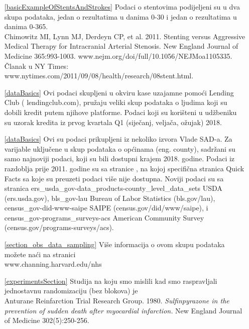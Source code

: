 \begin{itemize}
\setlength{\itemsep}{0mm}
\item[\ref{basicExampleOfStentsAndStrokes}]
    Podaci o stentovima podijeljeni su u dva skupa podataka,
    jedan o rezultatima u danima 0-30 i jedan o rezultatima u danima 0-365. \\
    Chimowitz MI, Lynn MJ, Derdeyn CP, et al. 2011.
    Stenting versus Aggressive Medical Therapy for
    Intracranial Arterial Stenosis.
    New England Journal of Medicine 365:993-1003.
        {www.nejm.org/doi/full/10.1056/NEJMoa1105335}. \\
    Članak u NY Times:
        {www.nytimes.com/2011/09/08/health/research/08stent.html}.

\item[\ref{dataBasics}]
    Ovi podaci skupljeni u okviru kase uzajamne pomoći Lending Club
    (
        {lendingclub.com}),
    pružaju veliki skup podataka o ljudima koji su
    dobili kredit putem njihove platforme.
    Podaci koji su korišteni u udžbeniku su uzorak kredita 
    iz prvog kvartala Q1 (siječanj, veljača, ožujak) 2018.
\item[\ref{dataBasics}]
    Ovi su podaci prikupljeni iz nekoliko izvora Vlade SAD-a.
    Za varijable uključene u skup podataka o općinama (eng. 
    county), sadržani su samo najnoviji podaci,
    koji su bili dostupni krajem 2018. godine.
    Podaci iz razdoblja prije 2011. godine su sa stranice
    ,
    na kojoj specifična stranica Quick Facts sa koje su preuzeti podaci
    više nije dostupna.
    Noviji podaci su sa stranica
    \oiRedirect
        {ers_usda_gov-data_products-county_level_data_sets}
        {USDA (ers.usda.gov)},
    \oiRedirect
        {bls_gov-lau}
        {Bureau of Labor Statistics (bls.gov/lau)},
    \oiRedirect
        {census_gov-did-www-saipe}
        {SAIPE (census.gov/did/www/saipe)},
    i
    \oiRedirect
        {census_gov-programs_surveys-acs}
        {American Community Survey
            (census.gov/programs-surveys/acs)}.

\item[\ref{section_obs_data_sampling}]
    Više informacija o ovom skupu podataka možete naći na stranici \\
        {www.channing.harvard.edu/nhs}

\item[\ref{experimentsSection}]
    Studija na koju smo mislili kad smo raspravljali
    jednostavnu randomizaciju (bez blokova) je \\
    Anturane Reinfarction Trial Research Group. 1980.
    \emph{Sulfinpyrazone in the prevention of sudden
    death after myocardial infarction.}
    New England Journal of Medicine 302(5):250-256.
\end{itemize}


